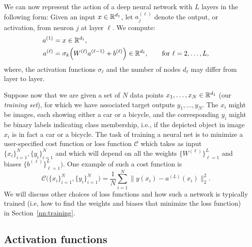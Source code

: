 We can now represent the action of a  deep neural network with $L$ layers in the following form:
Given an input $x \in \mathbb{R}^{d_1}$, let $a^{(\ell)}_j$ 
denote the output, or activation, from neuron $j$ at layer $\ell$. We compute:
\begin{equation}
\label{neuralnet}
\begin{split}
    a^{(1)} & = x \in \mathbb{R}^{d_1}, \\
    a^{(\ell)} & = \sigma_k \Big( W^{(\ell)} a^{(\ell-1)} + b^{(\ell)}\Big) \in \mathbb{R}^{d_\ell}, \qquad \text{for $\ell = 2,\dots, L$,}
\end{split}
\end{equation}
where, the activation functions $\sigma_\ell$ and the number of nodes $d_\ell$ may differ from layer to layer. 

Suppose now that we are given a set of $N$ data points $x_1,\dots, x_N \in \mathbb{R}^{d_1}$ (our {\em training set}), for which we have associated target outputs $y_1,\dots, y_N$. 
The $x_i$ might be images, each showing either a car or a bicycle, and the corresponding $y_i$ might be binary labels indicating class membership, i.e., if the depicted object in image $x_i$ is in fact a car or a bicycle.
The task of training a neural net is to minimize
a user-specified cost function or loss function ${\mathcal C}$ which takes as input $\{x_i\}_{i=1}^N,\{y_i\}_{i=1}^N$ and which will depend on all the weights $\{W^{(\ell)}\}_{\ell=1}^L$ and biases $\{b^{(\ell)}\}_{\ell=1}^L\big)$. One example of such a cost function is
$${\mathcal C}\big(\{x_i\}_{i=1}^N,\{y_i\}_{i=1}^N \big) = \frac{1}{N}  \sum_{i=1}^N \| y(x_i) - a^{(L)} (x_i)  \|_2^2. $$
We will discuss other choices of loss functions  and how such a network is typically trained (i.e, how to find the weights and biases that minimize the loss function) in Section~\ref{nn:training}.



\subsection{Activation functions}



